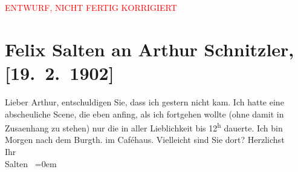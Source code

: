 
\begin{center}
            \textcolor{red}{ENTWURF, NICHT FERTIG KORRIGIERT}
                      \end{center}
            
         \renewcommand{\erwaehnteOrte}{Orte: Burgtheater, Wien}
         \renewcommand{\erwaehnteWerke}{}
               \section[Felix Salten an Arthur Schnitzler, {[}19. 2. 1902{]}]{ Felix Salten an Arthur Schnitzler, {[}19. 2. 1902{]}}\nopagebreak{}\rehead{ }\begin{ledgroupsized}[t]{13cm}\normalsize\beginnumbering \toendnotes[C]{\smallbreak\pagebreak[2]} 
\pstart
           \noindent{}{\pb}Lieber Arthur, entschuldigen Sie, dass ich gestern nicht kam. Ich
               hatte eine abscheuliche Scene, die eben anfing, als ich fortgehen wollte (ohne damit
               in Zusa{\geminationm}enhang zu stehen) nur die in aller Lieblichkeit
                  {\pb}bis 12\textsuperscript{h} dauerte. \pend
           \pstart
           Ich bin Morgen nach dem Burgth. im
               Caféhaus. Vielleicht sind Sie dort? \pend
           \pstart
           Herzlichst {\\[\baselineskip]}Ihr {\\[\baselineskip]}\spacefill\mbox{Salten }\pend
           \leftskip=0em{}
         
         \endnumbering{}\end{ledgroupsized}\begin{anhang}\end{anhang}\newcommand{\dateiname}{L03323}\newcommand{\titel}{Felix Salten an Arthur Schnitzler, [19. 2. 1902]}\newcommand{\editorInnen}{Martin Anton Müller und Laura Untner}
      